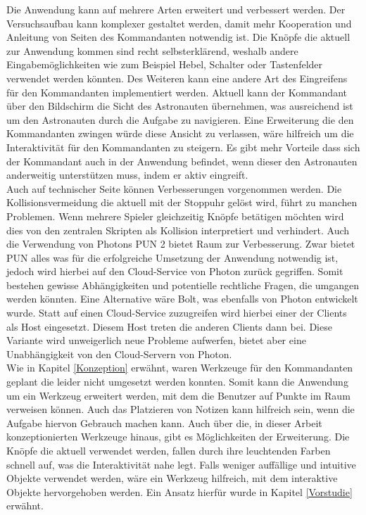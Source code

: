 Die Anwendung kann auf mehrere Arten erweitert und verbessert werden. Der Versuchsaufbau kann komplexer gestaltet werden, damit mehr Kooperation und Anleitung von Seiten des Kommandanten notwendig ist. Die Knöpfe die aktuell zur Anwendung kommen sind recht selbsterklärend, weshalb andere Eingabemöglichkeiten wie zum Beispiel Hebel, Schalter oder Tastenfelder verwendet werden könnten. Des Weiteren kann eine andere Art des Eingreifens für den Kommandanten implementiert werden. Aktuell kann der Kommandant über den Bildschirm die Sicht des Astronauten übernehmen, was ausreichend ist um den Astronauten durch die Aufgabe zu navigieren. Eine Erweiterung die den Kommandanten zwingen würde diese Ansicht zu verlassen, wäre hilfreich um die Interaktivität für den Kommandanten zu steigern. Es gibt mehr Vorteile dass sich der Kommandant auch in der Anwendung befindet, wenn dieser den Astronauten anderweitig unterstützen muss, indem er aktiv eingreift.\\

Auch auf technischer Seite können Verbesserungen vorgenommen werden. Die Kollisionsvermeidung die aktuell mit der Stoppuhr gelöst wird, führt zu manchen Problemen. Wenn mehrere Spieler gleichzeitig Knöpfe betätigen möchten wird dies von den zentralen Skripten als Kollision interpretiert und verhindert. Auch die Verwendung von Photons PUN 2 bietet Raum zur Verbesserung. Zwar bietet PUN alles was für die erfolgreiche Umsetzung der Anwendung notwendig ist, jedoch wird hierbei auf den Cloud-Service von Photon zurück gegriffen. Somit bestehen gewisse Abhängigkeiten und potentielle rechtliche Fragen, die umgangen werden könnten. Eine Alternative wäre Bolt, was ebenfalls von Photon entwickelt wurde. Statt auf einen Cloud-Service zuzugreifen wird hierbei einer der Clients als Host eingesetzt. Diesem Host treten die anderen Clients dann bei. Diese Variante wird unweigerlich neue Probleme aufwerfen, bietet aber eine Unabhängigkeit von den Cloud-Servern von Photon.\\

Wie in Kapitel \ref{Konzeption} erwähnt, waren Werkzeuge für den Kommandanten geplant die leider nicht umgesetzt werden konnten. Somit kann die Anwendung um ein Werkzeug erweitert werden, mit dem die Benutzer auf Punkte im Raum verweisen können. Auch das Platzieren von Notizen kann hilfreich sein, wenn die Aufgabe hiervon Gebrauch machen kann. Auch über die, in dieser Arbeit konzeptionierten Werkzeuge hinaus, gibt es Möglichkeiten der Erweiterung. Die Knöpfe die aktuell verwendet werden, fallen durch ihre leuchtenden Farben schnell auf, was die Interaktivität nahe legt. Falls weniger auffällige und intuitive Objekte verwendet werden, wäre ein Werkzeug hilfreich, mit dem interaktive Objekte hervorgehoben werden. Ein Ansatz hierfür wurde in Kapitel \ref{Vorstudie} erwähnt.
